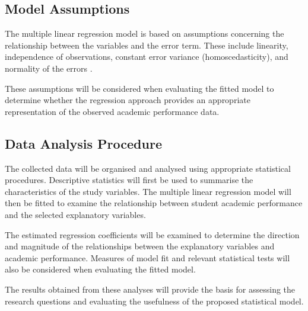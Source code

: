 \subsection{Model Assumptions}

The multiple linear regression model is based on assumptions concerning the relationship between the variables and the error term. These include linearity, independence of observations, constant error variance (homoscedasticity), and normality of the errors \citep{tamhane2020predictive}.

These assumptions will be considered when evaluating the fitted model to determine whether the regression approach provides an appropriate representation of the observed academic performance data.

\subsection{Data Analysis Procedure}

The collected data will be organised and analysed using appropriate statistical procedures. Descriptive statistics will first be used to summarise the characteristics of the study variables. The multiple linear regression model will then be fitted to examine the relationship between student academic performance and the selected explanatory variables.

The estimated regression coefficients will be examined to determine the direction and magnitude of the relationships between the explanatory variables and academic performance. Measures of model fit and relevant statistical tests will also be considered when evaluating the fitted model.

The results obtained from these analyses will provide the basis for assessing the research questions and evaluating the usefulness of the proposed statistical model.